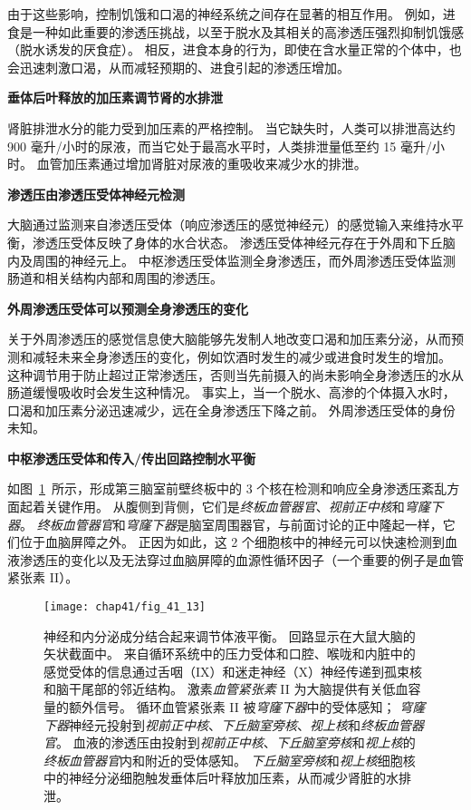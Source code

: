 由于这些影响，控制饥饿和口渴的神经系统之间存在显著的相互作用。
例如，进食是一种如此重要的渗透压挑战，以至于脱水及其相关的高渗透压强烈抑制饥饿感（脱水诱发的厌食症）。
相反，进食本身的行为，即使在含水量正常的个体中，也会迅速刺激口渴，从而减轻预期的、进食引起的渗透压增加。


\textbf{垂体后叶释放的加压素调节肾的水排泄}

肾脏排泄水分的能力受到加压素的严格控制。
当它缺失时，人类可以排泄高达约 900 毫升/小时的尿液，而当它处于最高水平时，人类排泄量低至约 15 毫升/小时。
血管加压素通过增加肾脏对尿液的重吸收来减少水的排泄。


\textbf{渗透压由渗透压受体神经元检测}

大脑通过监测来自渗透压受体（响应渗透压的感觉神经元）的感觉输入来维持水平衡，渗透压受体反映了身体的水合状态。
渗透压受体神经元存在于外周和下丘脑内及周围的神经元上。
中枢渗透压受体监测全身渗透压，而外周渗透压受体监测肠道和相关结构内部和周围的渗透压。


\textbf{外周渗透压受体可以预测全身渗透压的变化}

关于外周渗透压的感觉信息使大脑能够先发制人地改变口渴和加压素分泌，从而预测和减轻未来全身渗透压的变化，例如饮酒时发生的减少或进食时发生的增加。
这种调节用于防止超过正常渗透压，否则当先前摄入的尚未影响全身渗透压的水从肠道缓慢吸收时会发生这种情况。
事实上，当一个脱水、高渗的个体摄入水时，口渴和加压素分泌迅速减少，远在全身渗透压下降之前。
外周渗透压受体的身份未知。


\textbf{中枢渗透压受体和传入/传出回路控制水平衡}

如图~\ref{fig:41_13}~所示，形成第三脑室前壁终板中的 3 个核在检测和响应全身渗透压紊乱方面起着关键作用。
从腹侧到背侧，它们是\textit{终板血管器官}、\textit{视前正中核}和\textit{穹窿下器}。
\textit{终板血管器官}和\textit{穹窿下器}是脑室周围器官，与前面讨论的正中隆起一样，它们位于血脑屏障之外。
正因为如此，这 2 个细胞核中的神经元可以快速检测到血液渗透压的变化以及无法穿过血脑屏障的血源性循环因子（一个重要的例子是血管紧张素 II）。


\begin{figure}[htbp]
	\centering
	\texttt{[image: chap41/fig\_41\_13]}
	\caption{神经和内分泌成分结合起来调节体液平衡。
		回路显示在大鼠大脑的矢状截面中。
		来自循环系统中的压力受体和口腔、喉咙和内脏中的感觉受体的信息通过舌咽（IX）和迷走神经（X）神经传递到孤束核和脑干尾部的邻近结构。
		激素\textit{血管紧张素} II 为大脑提供有关低血容量的额外信号。
		循环血管紧张素 II 被\textit{穹窿下器}中的受体感知； 
		\textit{穹窿下器}神经元投射到\textit{视前正中核}、\textit{下丘脑室旁核}、\textit{视上核}和\textit{终板血管器官}。
		血液的渗透压由投射到\textit{视前正中核}、\textit{下丘脑室旁核}和\textit{视上核}的\textit{终板血管器官}内和附近的受体感知。
		\textit{下丘脑室旁核}和\textit{视上核}细胞核中的神经分泌细胞触发垂体后叶释放加压素，从而减少肾脏的水排泄\cite{swanson2000cerebral}。}
	\label{fig:41_13}
\end{figure}



